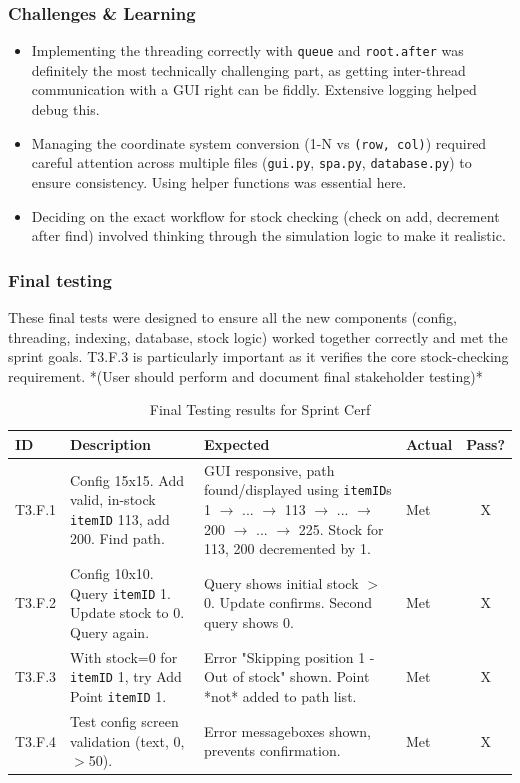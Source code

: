 \subsubsection{Challenges \& Learning}
\begin{itemize}
	\item Implementing the threading correctly with \verb|queue| and \verb|root.after| was definitely the most technically challenging part, as getting inter-thread communication with a GUI right can be fiddly. Extensive logging helped debug this.
	\item Managing the coordinate system conversion (1-N vs \verb|(row, col)|) required careful attention across multiple files (\verb|gui.py|, \verb|spa.py|, \verb|database.py|) to ensure consistency. Using helper functions was essential here.
	\item Deciding on the exact workflow for stock checking (check on add, decrement after find) involved thinking through the simulation logic to make it realistic.
\end{itemize}

\subsubsection{Final testing}
These final tests were designed to ensure all the new components (config, threading, indexing, database, stock logic) worked together correctly and met the sprint goals. T3.F.3 is particularly important as it verifies the core stock-checking requirement.
*(User should perform and document final stakeholder testing)*

\begin{table}[htbp] %
	\centering
	\begin{tabularx}{\textwidth}{|l|X|p{3.5cm}|p{3.5cm}|c|}
		\hline
		\textbf{ID} & \textbf{Description} & \textbf{Expected} & \textbf{Actual} & \textbf{Pass?} \\
		\hline
		T3.F.1 & Config 15x15. Add valid, in-stock \verb|itemID| 113, add 200. Find path. & GUI responsive, path found/displayed using \verb|itemID|s 1 $ \rightarrow $ ... $ \rightarrow $ 113 $ \rightarrow $ ... $ \rightarrow $ 200 $ \rightarrow $ ... $ \rightarrow $ 225. Stock for 113, 200 decremented by 1. & Met & X \\
		\hline
		T3.F.2 & Config 10x10. Query \verb|itemID| 1. Update stock to 0. Query again. & Query shows initial stock $>$ 0. Update confirms. Second query shows 0. & Met & X \\
		\hline
		T3.F.3 & With stock=0 for \verb|itemID| 1, try Add Point \verb|itemID| 1. & Error "Skipping position 1 - Out of stock" shown. Point *not* added to path list. & Met & X \\
		\hline
		T3.F.4 & Test config screen validation (text, 0, $>$50). & Error messageboxes shown, prevents confirmation. & Met & X \\
		\hline
	\end{tabularx}
	\caption{Final Testing results for Sprint Cerf}
\end{table}

